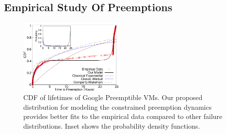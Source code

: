 






\subsection{Empirical Study Of Preemptions}


\begin{figure}
  \includegraphics[width=0.47\textwidth]{../data/gnuplot-figures/sigmetrics-fig-cdf-prob-inset-time.pdf} 
  \caption{CDF of lifetimes of Google Preemptible VMs. Our proposed distribution for modeling the constrained preemption dynamics provides better fits to the empirical data compared to other failure distributions. Inset shows the probability density functions.}
  \label{fig:gcp1}
\end{figure}

